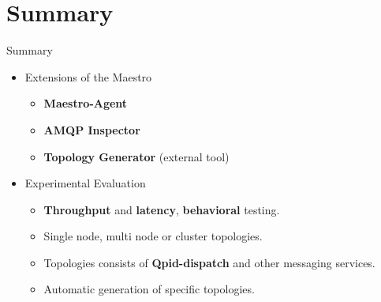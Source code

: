 \documentclass[hyperref={pdfpagelabels=false, unicode},pdf,slideColor,fyma,9pt]{beamer}
\begin{document}
		\section{Summary}
		\begin{frame}{Summary}
				\begin{itemize}
						\setlength\itemsep{0.5em}
						\item Extensions of the Maestro
						\vspace{0.5em}
						\begin{itemize}
							\setlength\itemsep{0.5em}
							\item \textbf{Maestro-Agent}
							\item \textbf{AMQP Inspector}
              \item \textbf{Topology Generator} (external tool)
						\end{itemize}
						\vspace{1em}
						\item Experimental Evaluation
						\vspace{0.5em}
						\begin{itemize}
							\setlength\itemsep{0.5em}
							\item \textbf{Throughput} and \textbf{latency}, \textbf{behavioral} testing.
              \item Single node, multi node or cluster topologies.
              \item Topologies consists of \textbf{Qpid-dispatch} and other messaging services.
              \item Automatic generation of specific topologies.
						\end{itemize}
				\end{itemize}
		\end{frame}
\end{document}
